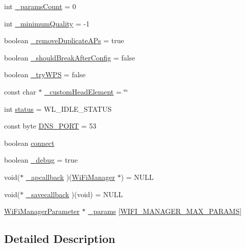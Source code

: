 \begin{DoxyCompactItemize}
\item 
int \hyperlink{class_wi_fi_manager_a22e803d23ae77cb611914445db17c9b6}{\+\_\+params\+Count} = 0
\item 
int \hyperlink{class_wi_fi_manager_ad1e130a5ce502767de764ea0cb1cecf6}{\+\_\+minimum\+Quality} = -\/1
\item 
boolean \hyperlink{class_wi_fi_manager_a94d25bd8d02bbf0236d75dfd8ee682d7}{\+\_\+remove\+Duplicate\+A\+Ps} = true
\item 
boolean \hyperlink{class_wi_fi_manager_adf42bd3bb7ac538e97407f66e5170858}{\+\_\+should\+Break\+After\+Config} = false
\item 
boolean \hyperlink{class_wi_fi_manager_aad7bf8cc9ff4bf7603f9ce42923c9df1}{\+\_\+try\+W\+PS} = false
\item 
const char $\ast$ \hyperlink{class_wi_fi_manager_a8860012564a62209d750c50e56319192}{\+\_\+custom\+Head\+Element} = \char`\"{}\char`\"{}
\item 
int \hyperlink{class_wi_fi_manager_acceea0054a30c18809b34151d4e9eb0b}{status} = W\+L\+\_\+\+I\+D\+L\+E\+\_\+\+S\+T\+A\+T\+US
\item 
const byte \hyperlink{class_wi_fi_manager_ad0be1f49d4d59067c3d96ae47b061f7f}{D\+N\+S\+\_\+\+P\+O\+RT} = 53
\item 
boolean \hyperlink{class_wi_fi_manager_a7be7e74e93283eea089af659184dd906}{connect}
\item 
boolean \hyperlink{class_wi_fi_manager_ac0f345f4a4c8bc38a49c8f87931b8cd4}{\+\_\+debug} = true
\item 
void($\ast$ \hyperlink{class_wi_fi_manager_ad166247d94aef10a3a8aa34da1351b27}{\+\_\+apcallback} )(\hyperlink{class_wi_fi_manager}{Wi\+Fi\+Manager} $\ast$) = N\+U\+LL
\item 
void($\ast$ \hyperlink{class_wi_fi_manager_a9a316060184788e33e71d88101cb2e0d}{\+\_\+savecallback} )(void) = N\+U\+LL
\item 
\hyperlink{class_wi_fi_manager_parameter}{Wi\+Fi\+Manager\+Parameter} $\ast$ \hyperlink{class_wi_fi_manager_a355ce9bbaab94baffd1c83de9b166fea}{\+\_\+params} \mbox{[}\hyperlink{_wi_fi_manager_read_file_button_8h_a5a8c6577015e3b2e82cf4bdab1475310}{W\+I\+F\+I\+\_\+\+M\+A\+N\+A\+G\+E\+R\+\_\+\+M\+A\+X\+\_\+\+P\+A\+R\+A\+MS}\mbox{]}
\end{DoxyCompactItemize}


\subsection{Detailed Description}


